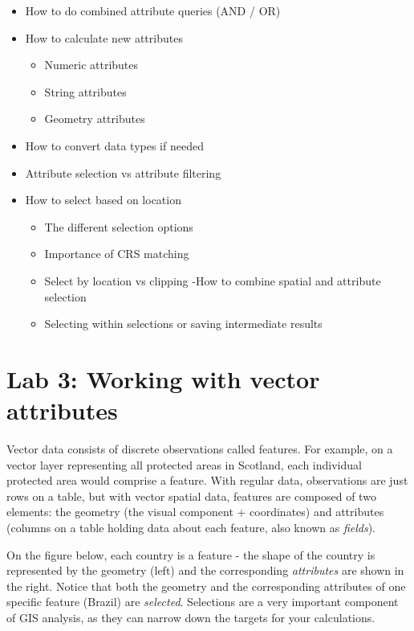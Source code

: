 \documentclass[
  letterpaper,
  DIV=11,
  numbers=noendperiod]{scrreprt}
\providecommand{\tightlist}{%
  \setlength{\itemsep}{0pt}\setlength{\parskip}{0pt}}\usepackage{longtable,booktabs,array}
\begin{document}
\begin{itemize}
\tightlist
\item
  How to do combined attribute queries (AND / OR)
\item
  How to calculate new attributes

  \begin{itemize}
  \tightlist
  \item
    Numeric attributes
  \item
    String attributes
  \item
    Geometry attributes\\
  \end{itemize}
\item
  How to convert data types if needed
\item
  Attribute selection vs attribute filtering
\item
  How to select based on location

  \begin{itemize}
  \tightlist
  \item
    The different selection options
  \item
    Importance of CRS matching
  \item
    Select by location vs clipping -How to combine spatial and attribute
    selection
  \item
    Selecting within selections or saving intermediate results
  \end{itemize}
\end{itemize}

\chapter{Lab 3: Working with vector attributes}\label{sec-labvec1}

Vector data consists of discrete observations called features. For
example, on a vector layer representing all protected areas in Scotland,
each individual protected area would comprise a feature. With regular
data, observations are just rows on a table, but with vector spatial
data, features are composed of two elements: the geometry (the visual
component + coordinates) and attributes (columns on a table holding data
about each feature, also known as \emph{fields}).

On the figure below, each country is a feature - the shape of the
country is represented by the geometry (left) and the corresponding
\emph{attributes} are shown in the right. Notice that both the geometry
and the corresponding attributes of one specific feature (Brazil) are
\emph{selected}. Selections are a very important component of GIS
analysis, as they can narrow down the targets for your calculations.
\end{document}
